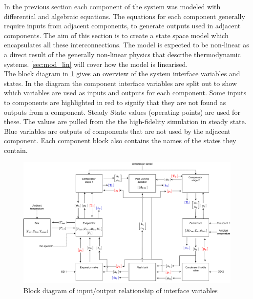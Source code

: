 
In the previous section each component of the system was modeled with differential and algebraic equations. The equations for each component generally require inputs from adjacent components, to generate outputs used in adjacent components. The aim of this section is to create a state space model which encapsulates all these interconnections. The model is expected to be non-linear as a direct result of the generally non-linear physics that describe thermodynamic systems. \cref{sec:mod_lin} will cover how the model is linearised.\\

The block diagram in \cref{fig:Block_diagram_inout} gives an overview of the system interface variables and states. In the diagram the component interface variables are split out to show which variables are used as inputs and outputs for each component. Some inputs to components are highlighted in red to signify that they are not found as outputs from a component. Steady State values (operating points) are used for these. The values are pulled from the the high-fidelity simulation in steady state. Blue variables are outputs of components that are not used by the adjacent component. Each component block also contains the names of the states they contain.

\begin{figure}[h!]
	\centering
	\includegraphics[width=1\textwidth]{Graphics/Block_Diagram_inout_flowValveVersion.pdf}
	\caption{Block diagram of input/output relationship of interface variables}
	\label{fig:Block_diagram_inout}
\end{figure} 

